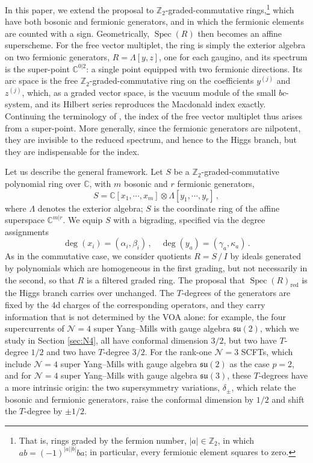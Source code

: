 \documentclass[12pt]{article}
\numberwithin{equation}{section}
\numberwithin{figure}{section}
\theoremstyle{plain}
\theoremstyle{definition}
\begin{document}
In this paper, we extend the proposal to $\mathbb{Z}_2$-graded-commutative rings,\footnote{That is, rings graded by the fermion number, $|a| \in \mathbb{Z}_2$, in which $ab = (-1)^{|a||b|} ba$; in particular, every fermionic element squares to zero.} which have both bosonic and fermionic generators, and in which the fermionic elements are counted with a sign. Geometrically, $\operatorname{Spec}(R)$ then becomes an affine superscheme. For the free vector multiplet, the ring is simply the exterior algebra on two fermionic generators, $R = \Lambda[y, z]$, one for each gaugino, and its spectrum is the super-point $\mathbb{C}^{0|2}$: a single point equipped with two fermionic directions. Its arc space is the free $\mathbb{Z}_2$-graded-commutative ring on the coefficients $y^{(j)}$ and $z^{(j)}$, which, as a graded vector space, is the vacuum module of the small $bc$-system, and its Hilbert series reproduces the Macdonald index exactly. Continuing the terminology of \cite{Kang:2025zub,Kang:2026ona}, the index of the free vector multiplet thus arises from a super-point. More generally, since the fermionic generators are nilpotent, they are invisible to the reduced spectrum, and hence to the Higgs branch, but they are indispensable for the index.

Let us describe the general framework. Let $S$ be a $\mathbb{Z}_2$-graded-commutative polynomial ring over $\mathbb{C}$, with $m$ bosonic and $r$ fermionic generators,
\begin{equation}
    S = \mathbb{C}[x_1, \cdots, x_m] \otimes \Lambda[y_1, \cdots, y_r] \,,
\end{equation}
where $\Lambda$ denotes the exterior algebra; $S$ is the coordinate ring of the affine superspace $\mathbb{C}^{m|r}$. We equip $S$ with a bigrading, specified via the degree assignments
\begin{equation}
    \operatorname{deg}(x_i) = (\alpha_i, \beta_i) \,, \quad \operatorname{deg}(y_a) = (\gamma_a, \kappa_a) \,.
\end{equation}
As in the commutative case, we consider quotients $R = S \, / \, I$ by ideals generated by polynomials which are homogeneous in the first grading, but not necessarily in the second, so that $R$ is a filtered graded ring. The proposal that $\operatorname{Spec}(R)_\text{red}$ is the Higgs branch carries over unchanged. The $T$-degrees of the generators are fixed by the 4d charges of the corresponding operators, and they carry information that is not determined by the VOA alone: for example, the four supercurrents of $\mathcal{N}=4$ super Yang--Mills with gauge algebra $\mathfrak{su}(2)$, which we study in Section \ref{sec:N4}, all have conformal dimension $3/2$, but two have $T$-degree $1/2$ and two have $T$-degree $3/2$. For the rank-one $\mathcal{N}=3$ SCFTs, which include $\mathcal{N}=4$ super Yang--Mills with gauge algebra $\mathfrak{su}(2)$ as the case $p = 2$, and for $\mathcal{N}=4$ super Yang--Mills with gauge algebra $\mathfrak{su}(3)$, these $T$-degrees have a more intrinsic origin: the two supersymmetry variations, $\delta_\pm$, which relate the bosonic and fermionic generators, raise the conformal dimension by $1/2$ and shift the $T$-degree by $\pm 1/2$.
\end{document}
